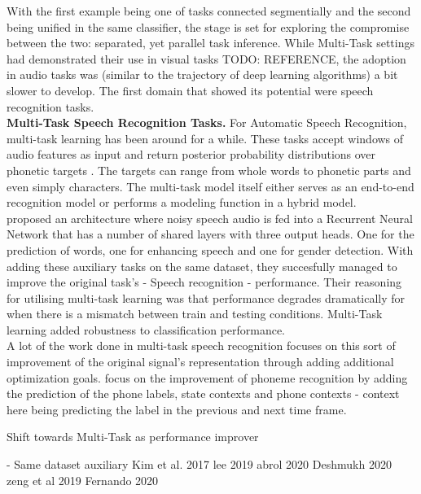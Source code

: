 With the first example being one of tasks connected segmentially and the second being unified in the same classifier, the stage is set for exploring the compromise between the two: separated, yet parallel task inference. While Multi-Task settings had demonstrated their use in visual tasks TODO: REFERENCE, the adoption in audio tasks was (similar to the trajectory of deep learning algorithms) a bit slower to develop. The first domain that showed its potential were speech recognition tasks.\\


\textbf{Multi-Task Speech Recognition Tasks.} For Automatic Speech Recognition, multi-task learning has been around for a while. These tasks accept windows of audio features as input and return posterior probability distributions over phonetic targets \citep{meyer2019multi}. The targets can range from whole words to phonetic parts and even simply characters. The multi-task model itself either serves as an end-to-end recognition model or performs a modeling function in a hybrid model. \\

\cite{lu2004multitask} proposed an architecture where noisy speech audio is fed into a Recurrent Neural Network that has a number of shared layers with three output heads. One for the prediction of words, one for enhancing speech and one for gender detection. With adding these auxiliary tasks on the same dataset, they succesfully managed to improve the original task's - Speech recognition - performance. Their reasoning for utilising multi-task learning was that performance degrades dramatically for when there is a mismatch between train and testing conditions. Multi-Task learning added robustness to classification performance. \\

A lot of the work done in multi-task speech recognition focuses on this sort of improvement of the original signal's representation through adding additional optimization goals. \cite{seltzer2013multi} focus on the improvement of phoneme recognition by adding the prediction of the phone labels, state contexts and phone contexts - context here being predicting the label in the previous and next time frame. 


Shift towards Multi-Task as performance improver

- Same dataset auxiliary
Kim et al. 2017
lee 2019
abrol 2020
Deshmukh 2020
zeng et al 2019
Fernando 2020

